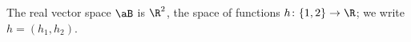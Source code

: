 The real vector space $\aB$ is $\R^2$, the space of functions $h\colon\{1,2\}\to\R$; we write $h=(h_1,h_2)$.

